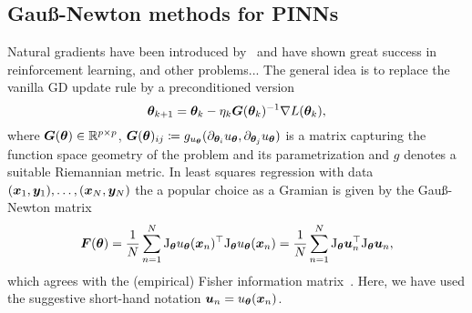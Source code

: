 \subsection{Gauß-Newton methods for PINNs} 


Natural gradients have been introduced by~\citet{amari1998natural} and have shown great success in reinforcement learning, and other problems...
The general idea is to replace the vanilla GD update rule by a preconditioned version
    \[ {\bm{\theta}}_{k+1} = {\bm{\theta}}_k - \eta_k {\bm{G}}({\bm{\theta}}_k)^{-1} \nabla L({\bm{\theta}}_k), \]
where ${\bm{G}}({\bm{\theta}})\in\mathbb R^{p\times p}$, ${\bm{G}}({\bm{\theta}})_{ij} \coloneqq g_{u_{\bm{\theta}}}(\partial_{{\bm{\theta}}_i} u_{\bm{\theta}}, \partial_{{\bm{\theta}}_j} u_{\bm{\theta}})$ is a matrix capturing the function space geometry of the problem and its parametrization and $g$ denotes a suitable Riemannian metric.
In least squares regression with data $({\bm{x}}_1, {\bm{y}}_1), \dots, ({\bm{x}}_N, {\bm{y}}_N)$ the %
a popular choice as a Gramian is given by the Gauß-Newton matrix 
\begin{equation}
  {\bm{F}}({\bm{\theta}}) = \frac1N\sum_{n=1}^N \mathrm{J}_{{\bm{\theta}}} u_{{\bm{\theta}}}({\bm{x}}_n)^\top \mathrm{J}_{{\bm{\theta}}} u_{{\bm{\theta}}}({\bm{x}}_n) = \frac1N\sum_{n=1}^N \mathrm{J}_{{\bm{\theta}}} {\bm{u}}_n^\top \mathrm{J}_{{\bm{\theta}}} {\bm{u}}_n
  ,
 \end{equation}
which agrees with the (empirical) Fisher information matrix~\citep{martens2020new, eschenhagen2023kroneckerfactored}. Here, we have used the suggestive short-hand notation ${\bm{u}}_n = u_{\bm{\theta}}({\bm{x}}_n)$. 
